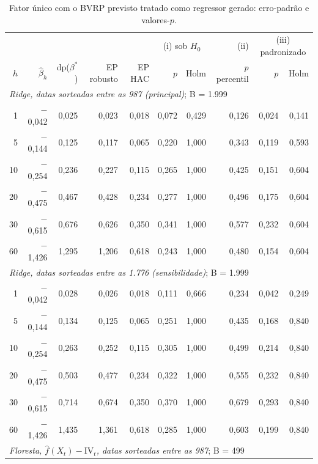 \begin{table}[H]
\centering
\scriptsize
\caption{Fator único com o BVRP previsto tratado como regressor gerado: erro-padrão e valores-$p$.}
\label{tab:apb2-regressor-gerado}
\begin{tabular}{rrrrrrrrrr}
\toprule
 & & & & & \multicolumn{2}{c}{(i) sob $H_0$} & (ii) & \multicolumn{2}{c}{(iii) padronizado} \\ \cmidrule(lr){6-7}\cmidrule(lr){9-10}
$h$ & $\hat\beta_h$ & dp($\beta^*$) & EP robusto & EP HAC & $p$ & Holm & $p$ percentil & $p$ & Holm \\
\midrule
\multicolumn{10}{l}{\textit{Ridge, datas sorteadas entre as 987 (principal)}; B = 1{.}999} \\
1 & $-$0{,}042 & 0{,}025 & 0{,}023 & 0{,}018 & 0{,}072 & 0{,}429 & 0{,}126 & 0{,}024 & 0{,}141 \\
5 & $-$0{,}144 & 0{,}125 & 0{,}117 & 0{,}065 & 0{,}220 & 1{,}000 & 0{,}343 & 0{,}119 & 0{,}593 \\
10 & $-$0{,}254 & 0{,}236 & 0{,}227 & 0{,}115 & 0{,}265 & 1{,}000 & 0{,}425 & 0{,}151 & 0{,}604 \\
20 & $-$0{,}475 & 0{,}467 & 0{,}428 & 0{,}234 & 0{,}277 & 1{,}000 & 0{,}496 & 0{,}175 & 0{,}604 \\
30 & $-$0{,}615 & 0{,}676 & 0{,}626 & 0{,}350 & 0{,}341 & 1{,}000 & 0{,}577 & 0{,}232 & 0{,}604 \\
60 & $-$1{,}426 & 1{,}295 & 1{,}206 & 0{,}618 & 0{,}243 & 1{,}000 & 0{,}480 & 0{,}154 & 0{,}604 \\
\midrule
\multicolumn{10}{l}{\textit{Ridge, datas sorteadas entre as 1.776 (sensibilidade)}; B = 1{.}999} \\
1 & $-$0{,}042 & 0{,}028 & 0{,}026 & 0{,}018 & 0{,}111 & 0{,}666 & 0{,}234 & 0{,}042 & 0{,}249 \\
5 & $-$0{,}144 & 0{,}134 & 0{,}125 & 0{,}065 & 0{,}251 & 1{,}000 & 0{,}435 & 0{,}168 & 0{,}840 \\
10 & $-$0{,}254 & 0{,}263 & 0{,}252 & 0{,}115 & 0{,}305 & 1{,}000 & 0{,}499 & 0{,}214 & 0{,}840 \\
20 & $-$0{,}475 & 0{,}503 & 0{,}477 & 0{,}234 & 0{,}322 & 1{,}000 & 0{,}555 & 0{,}232 & 0{,}840 \\
30 & $-$0{,}615 & 0{,}714 & 0{,}674 & 0{,}350 & 0{,}370 & 1{,}000 & 0{,}679 & 0{,}293 & 0{,}840 \\
60 & $-$1{,}426 & 1{,}435 & 1{,}361 & 0{,}618 & 0{,}285 & 1{,}000 & 0{,}603 & 0{,}199 & 0{,}840 \\
\midrule
\multicolumn{10}{l}{\textit{Floresta, $\hat f(X_t) - \text{IV}_t$, datas sorteadas entre as 987}; B = 499} \\

\end{tabular}
\end{table}
